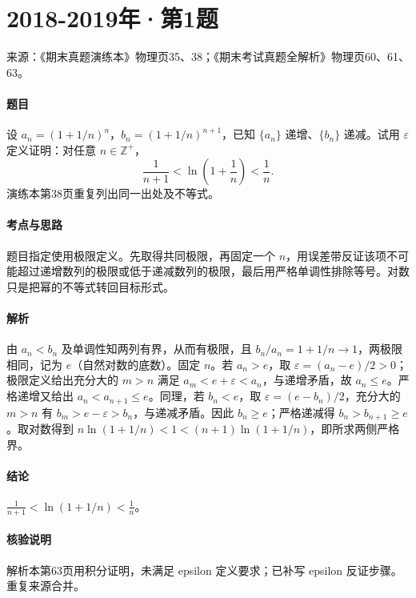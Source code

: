 \documentclass[UTF8,fontset=fandol,12pt,oneside,openany]{ctexrep}
\theoremstyle{definition}
\begin{document}
\par\addvspace{18pt}\noindent\begin{minipage}{\linewidth}
\section{2018-2019年·第1题}
\noindent 来源：《期末真题演练本》物理页35、38；《期末考试真题全解析》物理页60、61、63。

\paragraph{题目}
设 $a_n=(1+1/n)^n$，$b_n=(1+1/n)^{n+1}$，已知 $\{a_n\}$ 递增、$\{b_n\}$ 递减。试用 $\varepsilon$ 定义证明：对任意 $n\in\mathbb Z^+$，
\[
\frac1{n+1}<\ln\left(1+\frac1n\right)<\frac1n.
\]
演练本第38页重复列出同一出处及不等式。
\end{minipage}\par
\paragraph{考点与思路}
题目指定使用极限定义。先取得共同极限，再固定一个 $n$，用误差带反证该项不可能超过递增数列的极限或低于递减数列的极限，最后用严格单调性排除等号。对数只是把幂的不等式转回目标形式。

\paragraph{解析}
由 $a_n<b_n$ 及单调性知两列有界，从而有极限，且 $b_n/a_n=1+1/n\to1$，两极限相同，记为 $e$（自然对数的底数）。固定 $n$。若 $a_n>e$，取 $\varepsilon=(a_n-e)/2>0$；极限定义给出充分大的 $m>n$ 满足 $a_m<e+\varepsilon<a_n$，与递增矛盾，故 $a_n\le e$。严格递增又给出 $a_n<a_{n+1}\le e$。同理，若 $b_n<e$，取 $\varepsilon=(e-b_n)/2$，充分大的 $m>n$ 有 $b_m>e-\varepsilon>b_n$，与递减矛盾。因此 $b_n\ge e$；严格递减得 $b_n>b_{n+1}\ge e$。取对数得到 $n\ln(1+1/n)<1<(n+1)\ln(1+1/n)$，即所求两侧严格界。

\paragraph{结论}
$\frac1{n+1}<\ln(1+1/n)<\frac1n$。

\paragraph{核验说明}
解析本第63页用积分证明，未满足 epsilon 定义要求；已补写 epsilon 反证步骤。重复来源合并。
\end{document}
